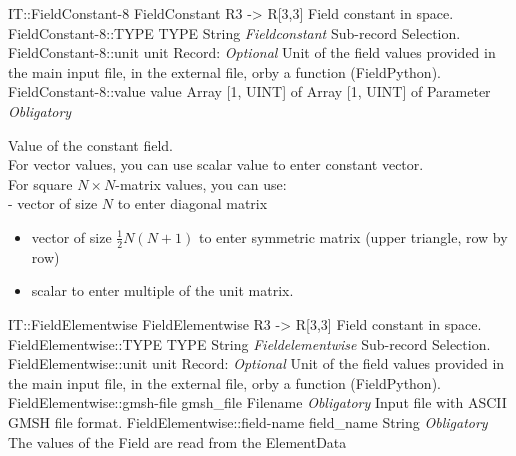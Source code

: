 \begin{RecordType}
	{IT::FieldConstant-8}
	{FieldConstant}
	{} %
	{} %
	{{{R3 -{\textgreater} R[3,3] Field constant in space.}}}
		\RecKey
			{FieldConstant-8::TYPE}
			{TYPE}
			{{String}}
			{ \it{Fieldconstant} }
			{{{Sub-record Selection.}}}
		\RecKey
			{FieldConstant-8::unit}
			{unit}
			{{Record}{: }}
			{ \it{Optional} }
			{{{Unit of the field values provided in the main input file, in the external file, orby a function (FieldPython).}}}
		\RecKey
			{FieldConstant-8::value}
			{value}
			{{Array [1, UINT] of }{Array [1, UINT] of }{Parameter}}
			{ \it{Obligatory} }
			{{{{Value of the constant field.}\\{
For vector values, you can use scalar value to enter constant vector.}\\{
For square }{$N\times N$}{-matrix values, you can use:}\\{
 - vector of size }{$N$}{ to enter diagonal matrix}
}
\begin{itemize}
\item {vector of size }{$\frac12N(N+1)$}{ to enter symmetric matrix (upper triangle, row by row)}
\item {scalar to enter multiple of the unit matrix.}
\end{itemize}
}}
\end{RecordType}
\begin{RecordType}
	{IT::FieldElementwise}
	{FieldElementwise}
	{} %
	{} %
	{{{R3 -{\textgreater} R[3,3] Field constant in space.}}}
		\RecKey
			{FieldElementwise::TYPE}
			{TYPE}
			{{String}}
			{ \it{Fieldelementwise} }
			{{{Sub-record Selection.}}}
		\RecKey
			{FieldElementwise::unit}
			{unit}
			{{Record}{: }}
			{ \it{Optional} }
			{{{Unit of the field values provided in the main input file, in the external file, orby a function (FieldPython).}}}
		\RecKey
			{FieldElementwise::gmsh-file}
			{gmsh{\_}file}
			{{Filename}}
			{ \it{Obligatory} }
			{{{Input file with ASCII GMSH file format.}}}
		\RecKey
			{FieldElementwise::field-name}
			{field{\_}name}
			{{String}}
			{ \it{Obligatory} }
			{{{The values of the Field are read from the }\ttfamily {\$}ElementData}}
\end{RecordType}
